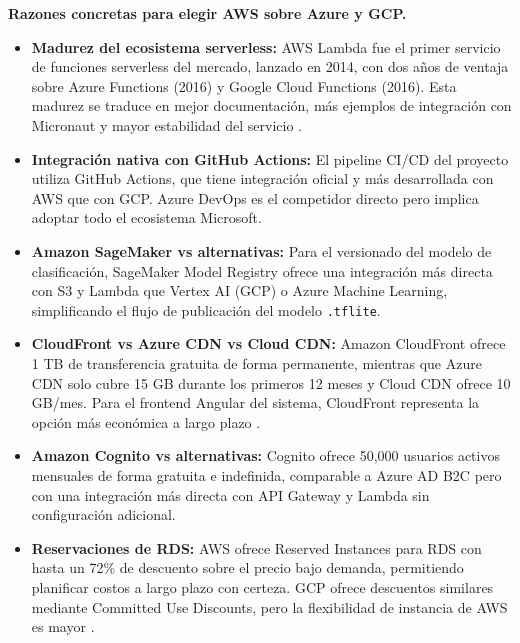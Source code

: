 \textbf{Razones concretas para elegir AWS sobre Azure y GCP.}

\begin{itemize}
    \item \textbf{Madurez del ecosistema serverless:} AWS Lambda fue
    el primer servicio de funciones serverless del mercado, lanzado
    en 2014, con dos años de ventaja sobre Azure Functions (2016) y
    Google Cloud Functions (2016). Esta madurez se traduce en mejor
    documentación, más ejemplos de integración con Micronaut y mayor
    estabilidad del servicio \cite{cloudplexo_serverless}.

    \item \textbf{Integración nativa con GitHub Actions:} El pipeline
    CI/CD del proyecto utiliza GitHub Actions, que tiene integración
    oficial y más desarrollada con AWS que con GCP. Azure DevOps es
    el competidor directo pero implica adoptar todo el ecosistema
    Microsoft.

    \item \textbf{Amazon SageMaker vs alternativas:} Para el
    versionado del modelo de clasificación, SageMaker Model Registry
    ofrece una integración más directa con S3 y Lambda que Vertex AI
    (GCP) o Azure Machine Learning, simplificando el flujo de
    publicación del modelo \texttt{.tflite}.

    \item \textbf{CloudFront vs Azure CDN vs Cloud CDN:} Amazon
    CloudFront ofrece 1 TB de transferencia gratuita de forma
    permanente, mientras que Azure CDN solo cubre 15 GB durante los
    primeros 12 meses y Cloud CDN ofrece 10 GB/mes. Para el frontend
    Angular del sistema, CloudFront representa la opción más económica
    a largo plazo \cite{aws_vs_azure_gcp_2025}.

    \item \textbf{Amazon Cognito vs alternativas:} Cognito ofrece
    50,000 usuarios activos mensuales de forma gratuita e indefinida,
    comparable a Azure AD B2C pero con una integración más directa
    con API Gateway y Lambda sin configuración adicional.

    \item \textbf{Reservaciones de RDS:} AWS ofrece Reserved Instances
    para RDS con hasta un 72\% de descuento sobre el precio bajo
    demanda, permitiendo planificar costos a largo plazo con certeza.
    GCP ofrece descuentos similares mediante Committed Use Discounts,
    pero la flexibilidad de instancia de AWS es mayor \cite{northflank_comparison}.


\end{itemize}
